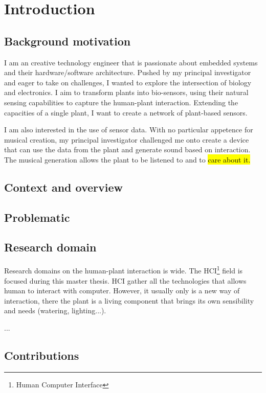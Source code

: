 \section{Introduction}

\subsection{Background motivation}

I am an creative technology engineer that is passionate about embedded systems and 
their hardware/software architecture.
Pushed by my principal investigator and eager to take on challenges, I wanted to 
explore the intersection of biology and electronics. 
I aim to transform plants into bio-sensors, using their natural sensing capabilities to 
capture the human-plant interaction. Extending the capacities of a single plant, I want to create a network of 
plant-based sensors. 

I am also interested in the use of sensor data. With no particular appetence for musical creation, 
my principal investigator challenged me onto create a device that can use the data from the plant 
and generate sound based on interaction. The musical generation allows the plant to be listened to and to \hl{care
about it.}

\subsection{Context and overview}

\subsection{Problematic}

\subsection{Research domain}

Research domains on the human-plant interaction is wide. The HCI\footnote{Human Computer Interface} field is focused
during this master thesis. HCI gather all the technologies that allows human to interact with computer.
However, it usually only is a new way of interaction, there the plant is a living component that brings its 
own sensibility and needs (watering, lighting...).

...


\subsection{Contributions}